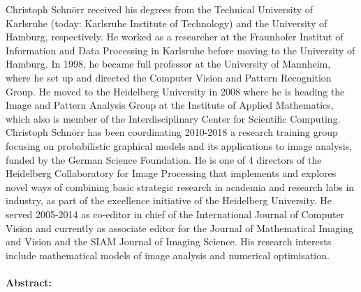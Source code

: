 Christoph Schnörr received his degrees from the Technical University of Karlsruhe (today: Karlsruhe Institute of Technology) and the University of Hamburg, respectively. He worked as a researcher at the Fraunhofer Institut of Information and Data Processing in Karlsruhe before moving to the University of Hamburg. In 1998, he became full professor at the University of Mannheim, where he set up and directed the Computer Vision and Pattern Recognition Group. He moved to the Heidelberg University in 2008 where he is heading the Image and Pattern Analysis Group at the Institute of Applied Mathematics, which also is member of the Interdisciplinary Center for Scientific Computing.
Christoph Schnörr has been coordinating 2010-2018 a research training group focusing on probabilistic graphical models and its applications to image analysis, funded by the German Science Foundation. He is one of 4 directors of the Heidelberg Collaboratory for Image Processing that implements and explores novel ways of combining basic strategic research in academia and research labs in industry, as part of the excellence initiative of the Heidelberg University. He served 2005-2014 as co-editor in chief of the International Journal of Computer Vision and currently as associate editor for the Journal of Mathematical Imaging and Vision and the SIAM Journal of Imaging Science.
His research interests include mathematical models of image analysis and numerical optimisation.  
\\\\

\textbf{Abstract:}\\

  

